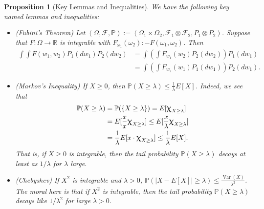 \documentclass[12pt,reqno]{article}
\renewcommand{\emph}[1]{\textit{#1}}
\theoremstyle{plain}
\newtheorem{prop}[theorem]{Proposition}
\theoremstyle{definition}
\renewcommand{\chi}{\scalebox{1.25}{$\upchi$}}
\begin{document}
\begin{prop}[Key Lemmas and Inequalities]
We have the following key named lemmas and inequalities:
\begin{itemize} 

\item[(A)] (\emph{Fubini's Theorem}) 
     Let $(\Omega, \mathcal{F}, \mathbb{P}) := (\Omega_1 \times \Omega_2, 
     \mathcal{F}_1 \otimes \mathcal{F}_2, P_1 \otimes P_2)$. 
     Suppose that $F: \Omega \rightarrow \mathbb{R}$ is integrable with 
     $F_{\omega_1}(\omega_2) :- F(\omega_1, \omega_2)$. Then 
     \begin{align*} 
     \int\int F(w_1, w_2) P_1(dw_1) P_2(dw_2) & = 
          \int\left(\int F_{w_1}(w_2) P_2(dw_2)\right) P_1(dw_1) \\ 
          & = \int\left(\int F_{w_2}(w_1) P_1(dw_1)\right) P_2(dw_1).
      \end{align*} 
\item[(B)] (\emph{Markov's Inequality}) 
     If $X \geq 0$, then 
     $\mathbb{P}(X \geq \lambda) \leq \frac{1}{\lambda} E[X]$. Indeed, 
     we see that 
     \begin{align*} 
     \mathbb{P}(X \geq \lambda) & = \mathbb{P}(\{X \geq \lambda\}) = 
          E[\chi_{X \geq \lambda}] \\ 
          & = E[\frac{x}{x} \chi_{X \geq \lambda}] \leq 
          E[\frac{x}{\lambda} \chi_{X \geq \lambda}] \\ 
          & = \frac{1}{\lambda} E[x \cdot \chi_{X \geq \lambda}] \leq 
          \frac{1}{\lambda} E[X]. 
     \end{align*} 
     That is, if $X \geq 0$ is integrable, then the tail probability 
     $\mathbb{P}(X \geq \lambda)$ decays at least as $1 / \lambda$ for 
     $\lambda$ large. 
     
\item[(C)] (\emph{Chebyshev}) If $X^2$ is integrable and $\lambda > 0$, 
     $\mathbb{P}(|X - E[X]| \geq \lambda) \leq 
     \frac{\operatorname{Var}(X)}{\lambda^2}$. The moral here is that if 
     $X^2$ is integrable, then the tail probability 
     $\mathbb{P}(X \geq \lambda)$ decays like $1 / \lambda^2$ for 
     large $\lambda > 0$. 
     

\end{itemize}
\end{prop}
\end{document}

